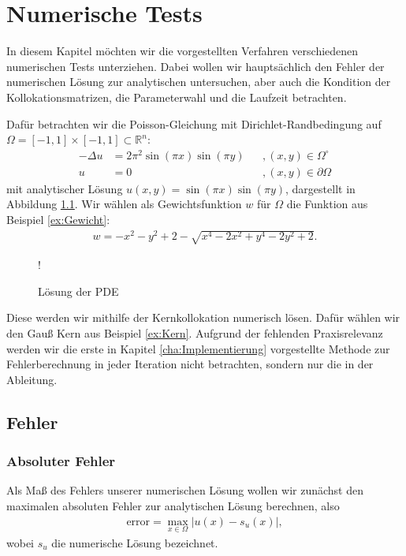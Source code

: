 \chapter{Numerische Tests}
\label{cha:NumerischeTests}

In diesem Kapitel möchten wir die vorgestellten Verfahren verschiedenen numerischen Tests unterziehen. Dabei wollen wir hauptsächlich den Fehler der numerischen Lösung zur analytischen untersuchen, aber auch die Kondition der Kollokationsmatrizen, die Parameterwahl und die Laufzeit betrachten.

Dafür betrachten wir die Poisson-Gleichung mit Dirichlet-Randbedingung auf $\Omega = [-1,1] \times [-1,1] \subset \mathbb{R}^n$:
\begin{align*}
- \Delta u &= 2\pi^2 \sin(\pi x)\sin(\pi y)&&, (x,y) \in \Omega^\circ\\
u &= 0&&, (x,y) \in \partial \Omega
\end{align*}
mit analytischer Lösung $u(x,y) = \sin(\pi x)\sin(\pi y)$, dargestellt in Abbildung \ref{fig:plot}. Wir wählen als Gewichtsfunktion $w$ für $\Omega$ die Funktion aus Beispiel \ref{ex:Gewicht}:
\begin{align*}
w = -x^2-y^2+2 - \sqrt{x^4 -2x^2 + y^4 -2y^2+2}.
\end{align*}
\begin{figure}[ht]
\centering
\resizebox {\columnwidth} {!} {

}
\caption{Lösung der \acs{PDE}}
\label{fig:plot}
\end{figure}

Diese werden wir mithilfe der Kernkollokation numerisch lösen. Dafür wählen wir den Gauß Kern aus Beispiel \ref{ex:Kern}. Aufgrund der fehlenden Praxisrelevanz werden wir die erste in Kapitel \ref{cha:Implementierung} vorgestellte Methode zur Fehlerberechnung in jeder Iteration nicht betrachten, sondern nur die in der Ableitung.

\section{Fehler}
\subsection{Absoluter Fehler}

Als Maß des Fehlers unserer numerischen Lösung wollen wir zunächst den maximalen absoluten Fehler zur analytischen Lösung berechnen, also
\begin{align*}
\text{error} = \max_{x \in \Omega} |u(x) - s_u (x)|,
\end{align*}
wobei $s_u$ die numerische Lösung bezeichnet.

